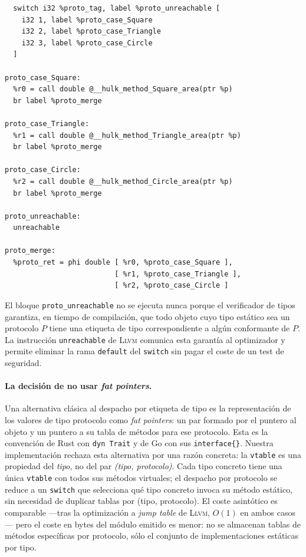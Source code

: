 \documentclass[11pt,a4paper,oneside,openany]{report}
\newcommand{\code}[1]{\texttt{#1}}
\newcommand{\llvm}{\textsc{Llvm}}
\begin{document}
\begin{lstlisting}[style=llvmst, caption={Patrón \llvm{}~IR para despacho de método de protocolo.}, label={lst:dispatch}]
  %proto_tag = load i32, ptr %p
  switch i32 %proto_tag, label %proto_unreachable [
    i32 1, label %proto_case_Square
    i32 2, label %proto_case_Triangle
    i32 3, label %proto_case_Circle
  ]

proto_case_Square:
  %r0 = call double @__hulk_method_Square_area(ptr %p)
  br label %proto_merge

proto_case_Triangle:
  %r1 = call double @__hulk_method_Triangle_area(ptr %p)
  br label %proto_merge

proto_case_Circle:
  %r2 = call double @__hulk_method_Circle_area(ptr %p)
  br label %proto_merge

proto_unreachable:
  unreachable

proto_merge:
  %proto_ret = phi double [ %r0, %proto_case_Square ],
                          [ %r1, %proto_case_Triangle ],
                          [ %r2, %proto_case_Circle ]
\end{lstlisting}

El bloque \code{proto\_unreachable} no se ejecuta nunca porque el
verificador de tipos garantiza, en tiempo de compilación, que todo objeto
cuyo tipo estático sea un protocolo $P$ tiene una etiqueta de tipo
correspondiente a algún conformante de $P$. La instrucción
\code{unreachable} de \llvm{} comunica esta garantía al optimizador y
permite eliminar la rama \code{default} del \code{switch} sin pagar el
coste de un test de seguridad.

\paragraph{La decisión de no usar \emph{fat pointers}.}
Una alternativa clásica al despacho por etiqueta de tipo es la
representación de los valores de tipo protocolo como \emph{fat pointers}:
un par formado por el puntero al objeto y un puntero a su tabla de
métodos para ese protocolo. Esta es la convención de Rust con
\code{dyn Trait} y de Go con sus \code{interface\{\}}. Nuestra
implementación rechaza esta alternativa por una razón concreta: la
\code{vtable} es una propiedad del \emph{tipo}, no del par
\emph{(tipo, protocolo)}. Cada tipo concreto tiene una única \code{vtable}
con todos sus métodos virtuales; el despacho por protocolo se reduce a un
\code{switch} que selecciona qué tipo concreto invoca su método estático,
sin necesidad de duplicar tablas por (tipo, protocolo). El coste asintótico
es comparable ---tras la optimización a \emph{jump table} de \llvm{}, $O(1)$
en ambos casos--- pero el coste en bytes del módulo emitido es menor: no se
almacenan tablas de métodos específicas por protocolo, sólo el conjunto de
implementaciones estáticas por tipo.
\end{document}
